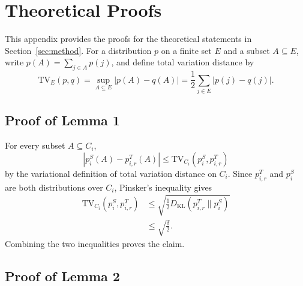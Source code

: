 \section{Theoretical Proofs}
\label{app:proofs}

This appendix provides the proofs for the theoretical statements in Section~\ref{sec:method}. For a distribution $p$ on a finite set $E$ and a subset $A\subseteq E$, write $p(A)=\sum_{j\in A}p(j)$, and define total variation distance by
\begin{equation}
    \mathrm{TV}_E(p,q)
    =
    \sup_{A\subseteq E}|p(A)-q(A)|
    =
    \frac{1}{2}\sum_{j\in E}|p(j)-q(j)|.
\end{equation}

\subsection{Proof of Lemma 1}

For every subset $A\subseteq C_i$,
\begin{equation}
    |p_i^S(A)-p^T_{i,r}(A)|
    \le
    \mathrm{TV}_{C_i}(p_i^S,p^T_{i,r})
\end{equation}
by the variational definition of total variation distance on $C_i$. Since $p^T_{i,r}$ and $p_i^S$ are both distributions over $C_i$, Pinsker's inequality gives
\begin{equation}
\begin{aligned}
    \mathrm{TV}_{C_i}(p_i^S,p^T_{i,r})
    &\le
    \sqrt{
    \frac{1}{2}
    D_{\mathrm{KL}}\left(p^T_{i,r}\|p_i^S\right)
    }\\
    &\le
    \sqrt{\frac{\delta}{2}}.
\end{aligned}
\end{equation}
Combining the two inequalities proves the claim.

\subsection{Proof of Lemma 2}

